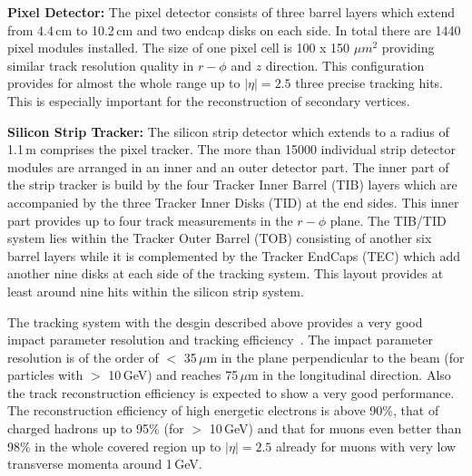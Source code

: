 \begin{description}
 \item \textbf{Pixel Detector:} The pixel detector consists of three barrel layers which extend from 4.4\,cm to 10.2\,cm and two endcap disks on each side. In total there are 1440 pixel modules installed. The size of one pixel cell is 100 x 150 $\mu m^2$ providing similar track resolution quality in $r-\phi$ and $z$ direction. This configuration provides for almost the whole range up to $|\eta| = 2.5$ three precise tracking hits. This is especially important for the reconstruction of secondary vertices.
 \item \textbf{Silicon Strip Tracker:} The silicon strip detector which extends to a radius of 1.1\,m comprises the pixel tracker. The more than 15000 individual strip detector modules are arranged in an inner and an outer detector part. The inner part of the strip tracker is build by the four Tracker Inner Barrel (TIB) layers which are accompanied by the three Tracker Inner Disks (TID) at the end sides. This inner part provides up to four track measurements in the $r-\phi$ plane. The TIB/TID system lies within the Tracker Outer Barrel (TOB) consisting of another six barrel layers while it is complemented by the Tracker EndCaps (TEC) which add another nine disks at each side of the tracking system. This layout provides at least around nine hits within the silicon strip system. 
\end{description}
The tracking system with the desgin described above provides a very good impact parameter resolution and tracking efficiency~\cite{bib:cmstdr:tracker}. The impact parameter resolution is of the order of $<$ 35\,$\mu$m in the plane perpendicular to the beam (for particles with \pt $>$ 10\,GeV) and reaches 75\,$\mu$m in the longitudinal direction. Also the track reconstruction efficiency is expected to show a very good performance. The reconstruction efficiency of high energetic electrons is above 90\%, that of charged hadrons up to 95\% (for \pt $>$ 10\,GeV) and that for muons even better than 98\% in the whole covered region up to $|\eta| = 2.5$ already for muons with very low transverse momenta around 1\,GeV.  

